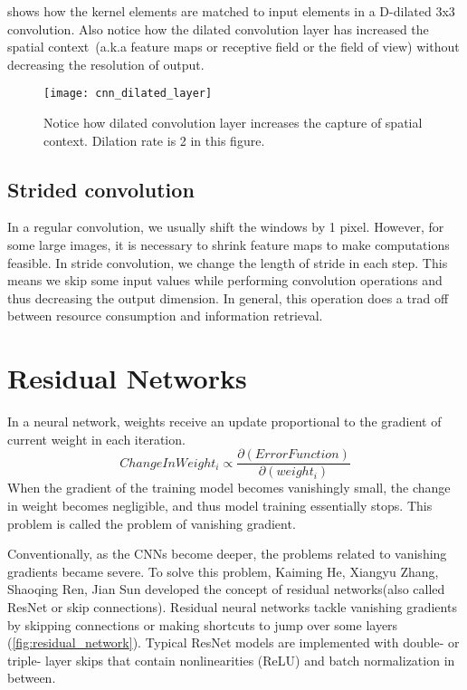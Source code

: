      shows how the kernel elements are matched to input elements in a D-dilated 3x3 convolution. Also notice how the dilated convolution layer has increased the spatial context~(a.k.a feature maps or receptive field or the field of view) without decreasing the resolution of output.
    \begin{figure}[h!]
        \centering
        \texttt{[image: cnn\_dilated\_layer]}
        \caption[Dilated convolution layer]{Notice how dilated convolution layer increases the capture of spatial context. Dilation rate is 2 in this figure.}
        \label{fig:dilated_layer}
    \end{figure}


\subsection{Strided convolution}
    In a regular convolution, we usually shift the windows by 1 pixel. However, for some large images, it is necessary to shrink feature maps to make computations feasible. In stride convolution, we change the length of stride in each step. This means we skip some input values while performing convolution operations and thus decreasing the output dimension. In general, this operation does a trad off between resource consumption and information retrieval.


\section[Residual Networks]{Residual Networks}

In a neural network, weights receive an update proportional to the gradient of current weight in each iteration. \begin{equation} ChangeInWeight_{i} \propto \frac{\partial(ErrorFunction)}{\partial(weight_{i})} \end{equation} When the gradient of the training model becomes vanishingly small, the change in weight becomes negligible, and thus model training essentially stops. This problem is called the problem of vanishing gradient.

Conventionally, as the CNNs become deeper, the problems related to vanishing gradients became severe. To solve this problem, {Kaiming He, Xiangyu Zhang, Shaoqing Ren, Jian Sun}\cite{ResNet} developed the concept of residual networks(also called ResNet or skip connections). Residual neural networks tackle vanishing gradients by skipping connections or making shortcuts to jump over some layers (\cref{fig:residual_network}). Typical ResNet models are implemented with double- or triple- layer skips that contain nonlinearities (ReLU) and batch normalization in between.

